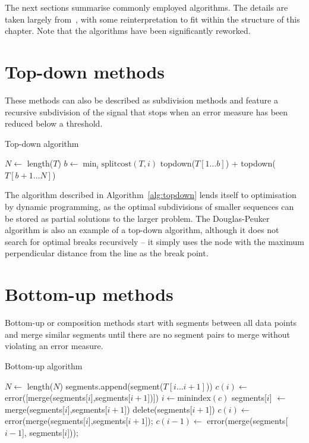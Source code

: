 The next sections summarise commonly employed algorithms.
The details are taken largely from~\citet{keogh.chu.ea1993segmenting}, with some reinterpretation to fit within the structure of this chapter.
Note that the algorithms have been significantly reworked.

\section{Top-down methods}
These methods can also be described as subdivision methods and feature a recursive subdivision of the signal that stops when an error measure has been reduced below a threshold.
\begin{algorithm}
  \caption{Top-down algorithm}
  \label{alg:topdown}
  \begin{algorithmic}
    \Else
      \State $N \gets $ length($T$)
      \State $b \gets \min_i{\mathrm{splitcost}(T,i)}$ 
      \Return topdown($T[1\dots b]$) + topdown($T[b+1\dots N]$)
    \EndIf
    \EndFunction
\end{algorithmic}
\end{algorithm}
The algorithm described in Algorithm~\ref{alg:topdown} lends itself to optimisation by dynamic programming, as the optimal subdivisions of smaller sequences can be stored as partial solutions to the larger problem.
The Douglas-Peuker algorithm \citep{douglas.peucker1973algorithms} is also an example of a top-down algorithm, although it does not search for optimal breaks recursively -- it simply uses the node with the maximum perpendicular distance from the line as the break point.

\section{Bottom-up methods}
Bottom-up or composition methods start with segments between all data points and merge similar segments until there are no segment pairs to merge without violating an error measure.

\begin{algorithm}
  \caption{Bottom-up algorithm}
  \label{alg:bottomup}
  \begin{algorithmic}
    \State $N \gets $ length($N$)
     
    \State segments.append(segment($T[i\dots i+1]$))
    \EndFor
     
    \State $c(i) \gets $error([merge(segments[$i$],segments[$i+1$])])
    \EndFor
    \State $i \gets \mathrm{minindex}(c)$ 
    \State segments[$i$] $\gets$ merge(segments[$i$],segments[$i+1$]) 
    \State delete(segments[$i+1$]) 
    \State $c(i) \gets $error(merge(segments[$i$],segments[$i+1$]);
    \State $c(i-1) \gets $ error(merge(segments[$i-1$], segments[$i$]));
    \EndWhile
    \EndFunction
  \end{algorithmic}
\end{algorithm}

